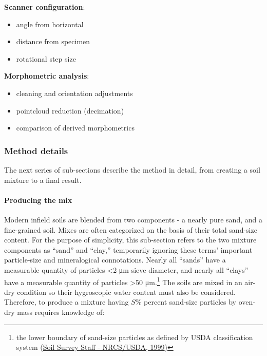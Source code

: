 \documentclass[
  letterpaper,
  openany]{book}
\providecommand{\tightlist}{%
  \setlength{\itemsep}{0pt}\setlength{\parskip}{0pt}}
\begin{document}
\textbf{Scanner configuration}:

\begin{itemize}
\tightlist
\item
  angle from horizontal
\item
  distance from specimen
\item
  rotational step size
\end{itemize}

\textbf{Morphometric analysis}:

\begin{itemize}
\tightlist
\item
  cleaning and orientation adjustments
\item
  pointcloud reduction (decimation)
\item
  comparison of derived morphometrics
\end{itemize}

\hypertarget{method-details}{%
\subsubsection{Method details}\label{method-details}}

The next series of sub-sections describe the method in detail, from creating a soil mixture to a final result.

\hypertarget{producing-the-mix}{%
\paragraph{Producing the mix}\label{producing-the-mix}}

Modern infield soils are blended from two components - a nearly pure sand, and a fine-grained soil.
Mixes are often categorized on the basis of their total sand-size content.
For the purpose of simplicity, this sub-section refers to the two mixture components as ``sand'' and ``clay,'' temporarily ignoring these terms' important particle-size and mineralogical connotations.
Nearly all ``sands'' have a measurable quantity of particles \textless2 μm sieve diameter, and nearly all ``clays'' have a measurable quantity of particles \textgreater50 μm.\footnote{the lower boundary of sand-size particles as defined by USDA classification system (\protect\hyperlink{ref-USDA1999}{Soil Survey Staff - NRCS/USDA, 1999})}
The soils are mixed in an air-dry condition so their hygroscopic water content must also be considered.
Therefore, to produce a mixture having \(S\)\% percent sand-size particles by oven-dry mass requires knowledge of:
\end{document}
